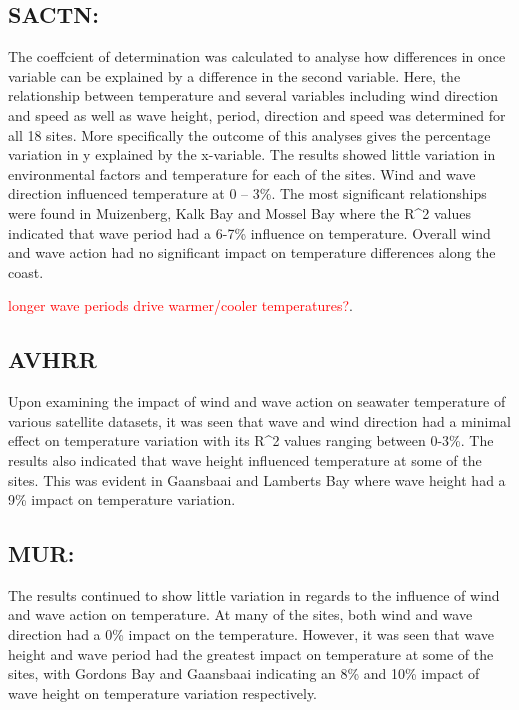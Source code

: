 \documentclass[12pt,A4paper,]{article}
\begin{document}
\subsection{SACTN:}\label{sactn}

The coeffcient of determination was calculated to analyse how
differences in once variable can be explained by a difference in the
second variable. Here, the relationship between temperature and several
variables including wind direction and speed as well as wave height,
period, direction and speed was determined for all 18 sites. More
specifically the outcome of this analyses gives the percentage variation
in y explained by the x-variable. The results showed little variation in
environmental factors and temperature for each of the sites. Wind and
wave direction influenced temperature at 0 -- 3\%. The most significant
relationships were found in Muizenberg, Kalk Bay and Mossel Bay where
the R\^{}2 values indicated that wave period had a 6-7\% influence on
temperature. Overall wind and wave action had no significant impact on
temperature differences along the coast.

\textcolor{red}{longer wave periods drive warmer/cooler temperatures?}.

\subsection{AVHRR}\label{avhrr}

Upon examining the impact of wind and wave action on seawater
temperature of various satellite datasets, it was seen that wave and
wind direction had a minimal effect on temperature variation with its
R\^{}2 values ranging between 0-3\%. The results also indicated that
wave height influenced temperature at some of the sites. This was
evident in Gaansbaai and Lamberts Bay where wave height had a 9\% impact
on temperature variation.

\subsection{MUR:}\label{mur}

The results continued to show little variation in regards to the
influence of wind and wave action on temperature. At many of the sites,
both wind and wave direction had a 0\% impact on the temperature.
However, it was seen that wave height and wave period had the greatest
impact on temperature at some of the sites, with Gordons Bay and
Gaansbaai indicating an 8\% and 10\% impact of wave height on
temperature variation respectively.
\end{document}
